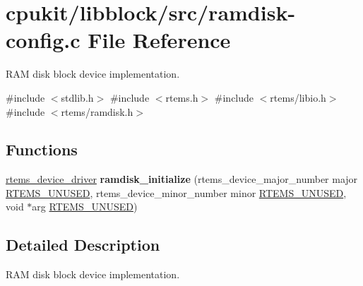 \hypertarget{ramdisk-config_8c}{}\section{cpukit/libblock/src/ramdisk-\/config.c File Reference}
\label{ramdisk-config_8c}


R\+AM disk block device implementation.  


{\ttfamily \#include $<$stdlib.\+h$>$}\newline
{\ttfamily \#include $<$rtems.\+h$>$}\newline
{\ttfamily \#include $<$rtems/libio.\+h$>$}\newline
{\ttfamily \#include $<$rtems/ramdisk.\+h$>$}\newline
\subsection*{Functions}
\begin{DoxyCompactItemize}
\item 
\mbox{\label{ramdisk-config_8c_a01aaaada6bc32713d2467dcd43d826f2}} 
\mbox{\hyperlink{group__ClassicStatus_ga545d41846817eaba6143d52ee4d9e9fe}{rtems\+\_\+device\+\_\+driver}} {\bfseries ramdisk\+\_\+initialize} (rtems\+\_\+device\+\_\+major\+\_\+number major \mbox{\hyperlink{group__RTEMSScoreBaseDefs_ga6794c0ff237a90e837e19f9bbcae4297}{R\+T\+E\+M\+S\+\_\+\+U\+N\+U\+S\+ED}}, rtems\+\_\+device\+\_\+minor\+\_\+number minor \mbox{\hyperlink{group__RTEMSScoreBaseDefs_ga6794c0ff237a90e837e19f9bbcae4297}{R\+T\+E\+M\+S\+\_\+\+U\+N\+U\+S\+ED}}, void $\ast$arg \mbox{\hyperlink{group__RTEMSScoreBaseDefs_ga6794c0ff237a90e837e19f9bbcae4297}{R\+T\+E\+M\+S\+\_\+\+U\+N\+U\+S\+ED}})
\end{DoxyCompactItemize}


\subsection{Detailed Description}
R\+AM disk block device implementation. 

